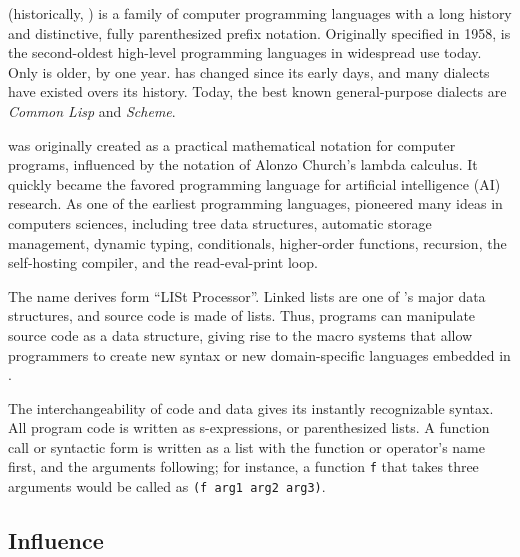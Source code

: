 \documentclass[../Languages.tex]{subfiles}
\begin{document}
\label{sec:lisp}

 (historically, ) is a family of computer programming
languages with a long history and distinctive, fully parenthesized prefix
notation. Originally specified in 1958,  is the second-oldest
high-level programming languages in widespread use today. Only
 is older, by one year.  has changed since
its early days, and many dialects have existed overs its history. Today, the
best known general-purpose  dialects are \textit{Common Lisp} and
\textit{Scheme}.

 was originally created as a practical mathematical notation for
computer programs, influenced by the notation of Alonzo Church's lambda
calculus. It quickly became the favored programming language for artificial
intelligence (AI) research. As one of the earliest programming languages,
 pioneered many ideas in computers sciences, including tree data
structures, automatic storage management, dynamic typing, conditionals,
higher-order functions, recursion, the self-hosting compiler, and the
read-eval-print loop.

The name  derives form ``LISt Processor''. Linked lists
are one of 's major data structures, and  source code
is made of lists. Thus,  programs can manipulate source code as a
data structure, giving rise to the macro systems that allow programmers to
create new syntax or new domain-specific languages embedded in .

The interchangeability of code and data gives  its instantly
recognizable syntax. All program code is written as s-expressions, or
parenthesized lists. A function call or syntactic form is written as a list
with the function or operator's name first, and the arguments following; for
instance, a function \texttt{f} that takes three arguments would be
called as \texttt{(f arg1 arg2 arg3)}.

\subsection{Influence}\label{sub:influence}
\end{document}
